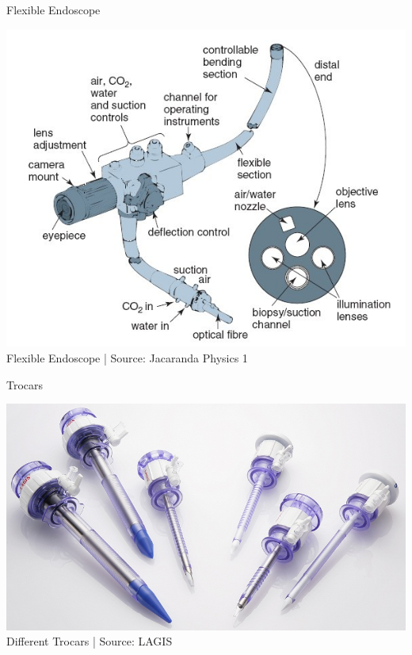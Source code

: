 \begin{frame}{Flexible Endoscope}

	\begin{center}
		\includegraphics[height=.8\textheight ]{images/flexibleSketch}\\
		\scriptsize Flexible Endoscope | Source: Jacaranda Physics 1
	\end{center}

\end{frame}



\begin{frame}{Trocars}

	\begin{center}
		\includegraphics[height=.8\textheight ]{images/trocars}\\
		\scriptsize Different Trocars | Source: LAGIS
	\end{center}

\end{frame}



